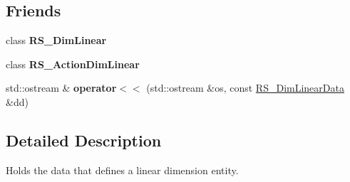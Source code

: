 \subsection*{Friends}
\begin{DoxyCompactItemize}
\item 
\hypertarget{classRS__DimLinearData_ab81aaab1236c306688e15c4843df4b98}{class {\bfseries R\-S\-\_\-\-Dim\-Linear}}\label{classRS__DimLinearData_ab81aaab1236c306688e15c4843df4b98}

\item 
\hypertarget{classRS__DimLinearData_ae34cbb28982a4bca7e05e1d7632208a1}{class {\bfseries R\-S\-\_\-\-Action\-Dim\-Linear}}\label{classRS__DimLinearData_ae34cbb28982a4bca7e05e1d7632208a1}

\item 
\hypertarget{classRS__DimLinearData_a1543a464524ec2f5acc4b6275d984d5e}{std\-::ostream \& {\bfseries operator$<$$<$} (std\-::ostream \&os, const \hyperlink{classRS__DimLinearData}{R\-S\-\_\-\-Dim\-Linear\-Data} \&dd)}\label{classRS__DimLinearData_a1543a464524ec2f5acc4b6275d984d5e}

\end{DoxyCompactItemize}


\subsection{Detailed Description}
Holds the data that defines a linear dimension entity. 

